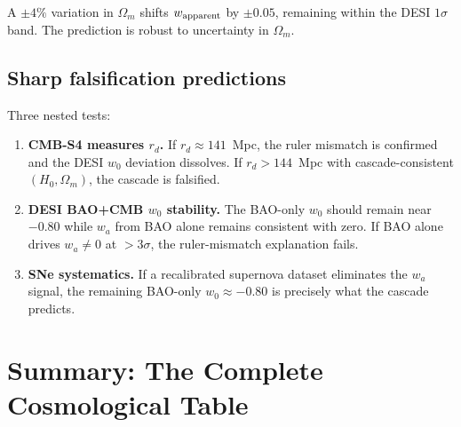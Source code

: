 \documentclass[12pt,a4paper]{article}
\begin{document}
A $\pm 4\%$ variation in $\Omega_m$ shifts $w_{\rm apparent}$ by $\pm 0.05$, remaining within
the DESI $1\sigma$ band. The prediction is robust to uncertainty in $\Omega_m$.

\subsection{Sharp falsification predictions}

Three nested tests:
\begin{enumerate}
\item \textbf{CMB-S4 measures $r_d$.} If $r_d \approx 141$~Mpc, the ruler mismatch is
confirmed and the DESI $w_0$ deviation dissolves. If $r_d > 144$~Mpc with
cascade-consistent $(H_0, \Omega_m)$, the cascade is falsified.
\item \textbf{DESI BAO+CMB $w_0$ stability.} The BAO-only $w_0$ should remain near
$-0.80$ while $w_a$ from BAO alone remains consistent with zero. If BAO alone drives
$w_a \neq 0$ at $> 3\sigma$, the ruler-mismatch explanation fails.
\item \textbf{SNe systematics.} If a recalibrated supernova dataset eliminates the $w_a$
signal, the remaining BAO-only $w_0 \approx -0.80$ is precisely what the cascade predicts.
\end{enumerate}

\section{Summary: The Complete Cosmological Table}
\end{document}
